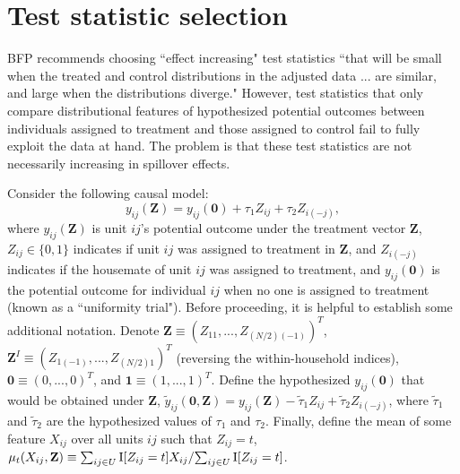 \documentclass[12pt]{article}
\newcommand{\Z}{\mathbf{Z}}
\newcommand{\I}{{\rm I}}
\newcommand{\T}{\mathcal{T}}
\newcommand{\0}{\mathbf{0}}
\newcommand{\one}{\mathbf{1}}
\begin{document}


\section*{Test statistic selection}

BFP recommends choosing ``effect increasing" test statistics ``that will be small when the treated and control distributions in the adjusted data ... are similar, and large when the distributions diverge." However, test statistics  that only compare distributional features of hypothesized potential outcomes between individuals assigned to treatment and those assigned to control fail to fully exploit the data at hand. The problem is that these test statistics are  not necessarily increasing in spillover effects. 

Consider the following causal model:
\begin{equation}\label{causal}
y_{ij}(\Z) = y_{ij}(\0) + \tau_1 Z_{ij} + \tau_2 Z_{i(-j)},
\end{equation}
where $y_{ij}(\Z)$ is unit $ij$'s potential outcome under the treatment vector $\Z$, $Z_{ij} \in \{0,1\}$ indicates if unit $ij$ was assigned to treatment in $\Z$, and $Z_{i(-j)}$ indicates if the housemate of unit $ij$ was assigned to treatment, and $y_{ij}(\0)$ is the potential outcome for individual $ij$ when no one is assigned to treatment (known as a ``uniformity trial").  Before proceeding, it is helpful to establish some additional notation. Denote $\Z \equiv (Z_{11}, ..., Z_{(N/2){(-1)}})^T$, $\Z^I \equiv (Z_{1(-1)},...,Z_{(N/2)1})^T$ (reversing the within-household indices), $\0 \equiv (0,...,0)^T$, and $\one \equiv (1,...,1)^T$. Define the hypothesized $y_{ij}(\0)$ that would be obtained under $\Z$, $\widetilde y_{ij}(\0,\Z) = y_{ij}(\Z) -  \widetilde \tau_1 Z_{ij} + \widetilde \tau_2 Z_{i(-j)}$, where $\widetilde \tau_1$ and $\widetilde \tau_2$ are the hypothesized values of $\tau_1$ and $\tau_2$. Finally, define the mean of some feature $X_{ij}$ over all units $ij$ such that $Z_{ij} = t$, $\mu_t(X_{ij},\Z) \equiv  {\sum_{ij \in U} \I[Z_{ij} = t] X_{ij}} / {\sum_{ij \in U} \I[Z_{ij} = t]}$. %
\end{document}
